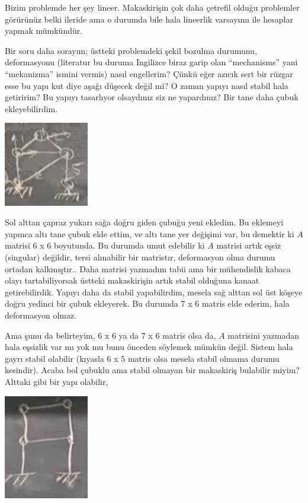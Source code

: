 \documentclass[12pt,fleqn]{article}\usepackage{../../common}
\begin{document}
Bizim problemde her şey lineer. Makaskirişin çok daha çetrefil olduğu problemler
görürünüz belki ileride ama o durumda bile hala lineerlik varsayımı ile hesaplar
yapmak mümkündür.

Bir soru daha sorayım; üstteki problemdeki şekil bozulma durumunu, deformasyonu
(literatur bu duruma Ingilizce biraz garip olan ``mechanisms'' yani
``mekanizma'' ismini vermis) nasıl engellerim? Çünkü eğer azıcık sert bir rüzgar
esse bu yapı kut diye aşağı düşecek değil mi? O zaman yapıyı nasıl stabil hala
getiririm? Bu yapıyı tasarlıyor olsaydınız siz ne yapardınız? Bir tane daha
çubuk ekleyebilirdim.

\includegraphics[width=10em]{compscieng_1_15_05.png}

Sol alttan çapraz yukarı sağa doğru giden çubuğu yeni ekledim. Bu eklemeyi
yapınca altı tane çubuk elde ettim, ve altı tane yer değişimi var, bu demektir
ki $A$ matrisi 6 x 6 boyutunda. Bu durumda umut edebilir ki $A$ matrisi artık
eşsiz (singular) değildir, tersi alınabilir bir matristır, deformasyon olma
durumu ortadan kalkmıştır.. Daha matrisi yazmadım tabii ama bir mühendislik
kabaca olayı tartabiliyorsak üstteki makaskirişin artık stabil olduğuna kanaat
getirebilirdik. Yapıyı daha da stabil yapabilirdim, mesela sağ alttan sol üst
köşeye doğru yedinci bir çubuk ekleyerek. Bu durumda 7 x 6 matris elde ederim,
hala deformasyon olmaz.

Ama şunu da belirteyim, 6 x 6 ya da 7 x 6 matris olsa da, $A$ matrisini yazmadan
hala eşsizlik var mı yok mu bunu önceden söylemek mümkün değil. Sistem hala
gayrı stabil olabilir (kıyasla 6 x 5 matris olsa mesela stabil olmama durumu
kesindir). Acaba bol çubuklu ama stabil olmayan bir makaskiriş bulabilir miyim?
Alttaki gibi bir yapı olabilir,

\includegraphics[width=10em]{compscieng_1_15_06.png}
\end{document}

